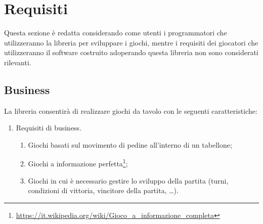 \section{Requisiti}

Questa sezione è redatta considerando come utenti i programmatori che utilizzeranno la libreria per sviluppare i giochi, mentre i requisiti dei giocatori che utilizzeranno il software costruito adoperando questa libreria non sono considerati rilevanti.

\subsection{Business}

La libreria consentirà di realizzare giochi da tavolo con le seguenti caratteristiche:
%
\begin{enumerate}
    \item Requisiti di business.
    \begin{enumerate}[label*=\arabic*.]
        \item Giochi basati sul movimento di pedine all'interno di un tabellone;
        \item Giochi a informazione perfetta\footnote{\url{https://it.wikipedia.org/wiki/Gioco_a_informazione_completa}};
        \item Giochi in cui è necessario gestire lo sviluppo della partita (turni, condizioni di vittoria, vincitore della partita, \dots).
    \end{enumerate}
\end{enumerate}

